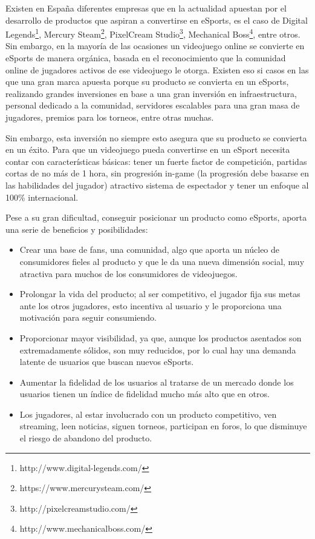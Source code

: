 Existen en España diferentes empresas que en la actualidad apuestan por el desarrollo de productos que aspiran a convertirse en eSports, es el caso de Digital Legends\footnote{http://www.digital-legends.com/}, Mercury Steam\footnote{https://www.mercurysteam.com/}, PixelCream Studio\footnote{http://pixelcreamstudio.com/}, Mechanical Boss\footnote{http://www.mechanicalboss.com/}, entre otros. Sin embargo, en la mayoría de las ocasiones un videojuego online se convierte en eSports de manera orgánica, basada en el reconocimiento que la comunidad online de jugadores activos de ese videojuego le otorga. Existen eso si casos en las que una gran marca apuesta porque su producto se convierta en un eSports, realizando grandes inversiones en base a una gran inversión en infraestructura, personal dedicado a la comunidad, servidores escalables para una gran masa de jugadores, premios para los torneos, entre otras muchas. 

Sin embargo, esta inversión no siempre esto asegura que su producto se convierta en un éxito. Para que un videojuego pueda convertirse en un eSport necesita contar con características básicas: tener un fuerte factor de competición, partidas cortas de no más de 1 hora, sin progresión in-game (la progresión debe basarse en las habilidades del jugador) atractivo sistema de espectador y tener un enfoque al 100\% internacional.

Pese a su gran dificultad, conseguir posicionar un producto como eSports, aporta una serie de beneficios y posibilidades: 
\begin{itemize}
\item Crear una base de fans, una comunidad, algo que aporta un núcleo de consumidores fieles al producto y que le da una nueva dimensión social, muy atractiva para muchos de los consumidores de videojuegos.
\item Prolongar la vida del producto; al ser competitivo, el jugador fija sus metas ante los otros jugadores, esto incentiva al usuario y le proporciona una motivación para seguir consumiendo.
\item Proporcionar mayor visibilidad, ya que, aunque los productos asentados son extremadamente sólidos, son muy reducidos, por lo cual hay una demanda latente de usuarios que buscan nuevos eSports.
\item Aumentar la fidelidad de los usuarios al tratarse de un mercado donde los usuarios tienen un índice de fidelidad mucho más alto que en otros.
\item Los jugadores, al estar involucrado con un producto competitivo, ven streaming, leen noticias, siguen torneos, participan en foros, lo que disminuye el riesgo de abandono del producto.
\end{itemize}

